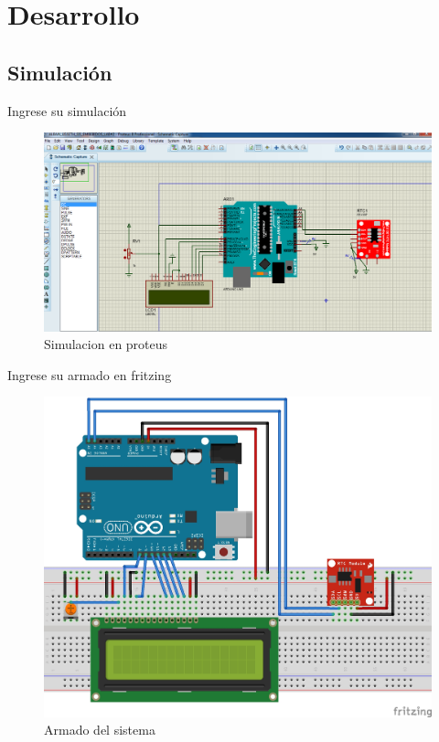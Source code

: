 \documentclass[10pt,a4paper]{article}
\begin{document}
\section{Desarrollo}

\subsection{Simulación}
Ingrese su simulación

\begin{figure}[ht!]
\caption{Simulacion en proteus}
\centering
\includegraphics[scale=0.3]{SIMULACION.png}
\end{figure} 

Ingrese su armado en fritzing 
\begin{figure}[hbtp]
\caption{Armado del sistema}
\centering
\includegraphics[scale=0.4]{3D.jpg}
\end{figure}
\end{document}
